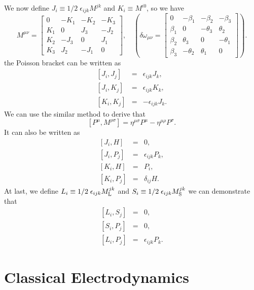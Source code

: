 We now define $J_i \equiv 1/2 \; \epsilon_{ijk} M^{jk}$ and $K_i \equiv M^{i0}$, so we have
\[M^{\mu \nu} = \left[ 
\begin{matrix} 
0   & -K_1 & -K_2 & -K_3 \\ 
K_1 & 0    & J_3  & -J_2 \\
K_2 & -J_3 & 0    &  J_1 \\
K_3 & J_2  & -J_1 &  0
\end{matrix} 
\right] , \quad \left( 
\delta \omega_{\mu\nu} = \left[
\begin{matrix} 
0       & -\beta_1   & -\beta_2   & -\beta_3   \\ 
\beta_1 & 0         & -\theta_3 & \theta_2  \\
\beta_2 & \theta_3  & 0         & -\theta_1 \\
\beta_3 & -\theta_2 & \theta_1  & 0
\end{matrix} 
\right] \right).\] 
the Poisson bracket can be written as
\begin{eqnarray}
	\left[J_i,J_j\right] &=& \epsilon_{ijk}J_k , \nonumber \\
	\left[J_i,K_j\right] &=& \epsilon_{ijk}K_k ,\nonumber \\
	\left[K_i,K_j\right] &=& -\epsilon_{ijk}J_k .\nonumber
\end{eqnarray}
We can use the similar method to derive that
\[[P^{\mu},M^{\rho \sigma}] = \eta^{\mu \sigma}P^{\mu} - \eta^{\mu \rho}P^{\sigma}.\]
It can also be written as
\begin{eqnarray}
	\left[J_i,H\right] &=& 0 ,\nonumber \\
	\left[J_i,P_j\right] &=& \epsilon_{ijk}P_k, \nonumber \\
	\left[K_i,H\right] &=& P_i ,\nonumber \\
	\left[K_i,P_j\right] &=& \delta_{ij}H .\nonumber
\end{eqnarray}
At last, we define $L_i \equiv 1/2 \; \epsilon_{ijk} M_{\rm L}^{jk}$ and $S_i \equiv 1/2 \; \epsilon_{ijk} M_{\rm S}^{jk}$
we can demonstrate that
\begin{eqnarray}
	\left[L_i,S_j\right] &=& 0 ,\nonumber \\
	\left[S_i,P_j\right] &=& 0, \nonumber \\
	\left[L_i,P_j\right] &=& \epsilon_{ijk}P_k . \nonumber
\end{eqnarray}

\chapter{Classical Electrodynamics}
